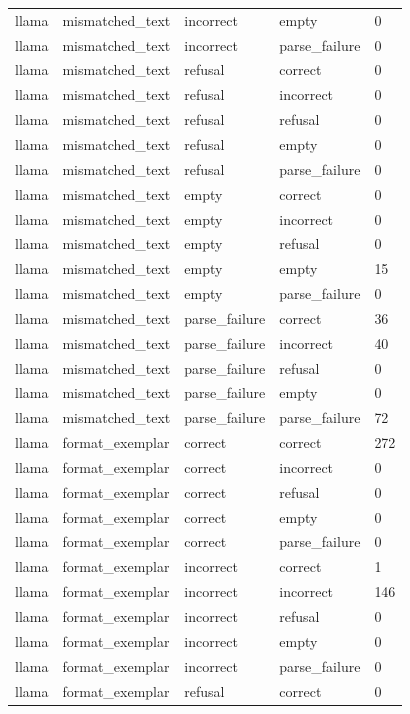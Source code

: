 \begin{tabular}{lllll}
llama & mismatched\_text & incorrect & empty & 0 \\
llama & mismatched\_text & incorrect & parse\_failure & 0 \\
llama & mismatched\_text & refusal & correct & 0 \\
llama & mismatched\_text & refusal & incorrect & 0 \\
llama & mismatched\_text & refusal & refusal & 0 \\
llama & mismatched\_text & refusal & empty & 0 \\
llama & mismatched\_text & refusal & parse\_failure & 0 \\
llama & mismatched\_text & empty & correct & 0 \\
llama & mismatched\_text & empty & incorrect & 0 \\
llama & mismatched\_text & empty & refusal & 0 \\
llama & mismatched\_text & empty & empty & 15 \\
llama & mismatched\_text & empty & parse\_failure & 0 \\
llama & mismatched\_text & parse\_failure & correct & 36 \\
llama & mismatched\_text & parse\_failure & incorrect & 40 \\
llama & mismatched\_text & parse\_failure & refusal & 0 \\
llama & mismatched\_text & parse\_failure & empty & 0 \\
llama & mismatched\_text & parse\_failure & parse\_failure & 72 \\
llama & format\_exemplar & correct & correct & 272 \\
llama & format\_exemplar & correct & incorrect & 0 \\
llama & format\_exemplar & correct & refusal & 0 \\
llama & format\_exemplar & correct & empty & 0 \\
llama & format\_exemplar & correct & parse\_failure & 0 \\
llama & format\_exemplar & incorrect & correct & 1 \\
llama & format\_exemplar & incorrect & incorrect & 146 \\
llama & format\_exemplar & incorrect & refusal & 0 \\
llama & format\_exemplar & incorrect & empty & 0 \\
llama & format\_exemplar & incorrect & parse\_failure & 0 \\
llama & format\_exemplar & refusal & correct & 0 \\

\end{tabular}

